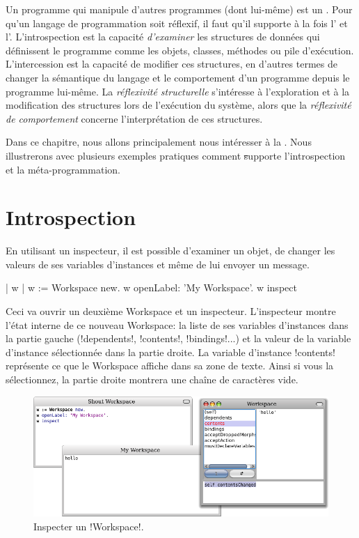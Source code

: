 \documentclass[a4paper,10pt,twoside]{book}
\begin{document}
Un programme qui manipule d'autres programmes (dont lui-même) est un .
Pour qu'un langage de programmation soit réflexif, il faut qu'il supporte à la fois l' et l'. L'introspection est la capacité \emph{d'examiner} les structures de données qui définissent le programme comme les objets, classes, méthodes ou pile d'exécution. L'intercession est la capacité de modifier ces structures, en d'autres termes de changer la sémantique du langage et le comportement d'un programme depuis le programme lui-même.
La \emph{réflexivité structurelle} s'intéresse à l'exploration et à la modification des structures lors de l'exécution du système, alors que la \emph{réflexivité de comportement} concerne l'interprétation de ces structures.

Dans ce chapitre, nous allons principalement nous intéresser à la .
Nous illustrerons avec plusieurs exemples pratiques comment \st supporte l'introspection et la méta-programmation.

\section{Introspection}

En utilisant un inspecteur, il est possible d'examiner un objet, de changer les valeurs de ses variables d'instances et même de lui envoyer un message.

\begin{code}{| w |}
w := Workspace new.
w openLabel: 'My Workspace'.
w inspect
\end{code}

Ceci va ouvrir un deuxième Workspace et un inspecteur.
L'inspecteur montre l'état interne de ce nouveau Workspace: la liste de ses variables d'instances dans la partie gauche (\ct!dependents!, \ct!contents!, \ct!bindings!...) et la valeur de la variable d'instance sélectionnée dans la partie droite.
La variable d'instance \ct!contents! représente ce que le Workspace affiche dans sa zone de texte. Ainsi si vous la sélectionnez, la partie droite montrera une chaîne de caractères vide.

\begin{figure}[ht]\centering
	\includegraphics[width=\linewidth]{workspaceInspector}
	\caption{Inspecter un \ct!Workspace!.}
\end{figure}
\end{document}
